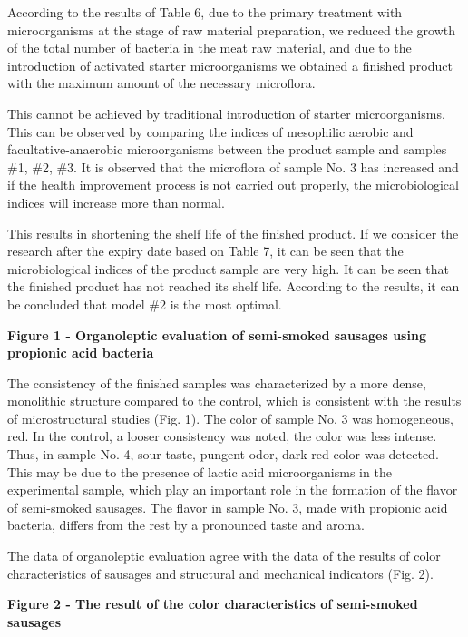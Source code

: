 \begin{multicols}{2}
According to the results of Table 6, due to the primary treatment with
microorganisms at the stage of raw material preparation, we reduced the
growth of the total number of bacteria in the meat raw material, and due
to the introduction of activated starter microorganisms we obtained a
finished product with the maximum amount of the necessary microflora.

This cannot be achieved by traditional introduction of starter
microorganisms. This can be observed by comparing the indices of
mesophilic aerobic and facultative-anaerobic microorganisms between the
product sample and samples \#1, \#2, \#3. It is observed that the
microflora of sample No. 3 has increased and if the health improvement
process is not carried out properly, the microbiological indices will
increase more than normal.

This results in shortening the shelf life of the finished product. If we
consider the research after the expiry date based on Table 7, it can be
seen that the microbiological indices of the product sample are very
high. It can be seen that the finished product has not reached its shelf
life. According to the results, it can be concluded that model \#2 is
the most optimal.
\end{multicols}

{\bfseries Figure 1 - Organoleptic evaluation of semi-smoked sausages using propionic acid bacteria}

\begin{multicols}{2}
The consistency of the finished samples was characterized by a more
dense, monolithic structure compared to the control, which is consistent
with the results of microstructural studies (Fig. 1). The color of
sample No. 3 was homogeneous, red. In the control, a looser consistency
was noted, the color was less intense. Thus, in sample No. 4, sour
taste, pungent odor, dark red color was detected. This may be due to the
presence of lactic acid microorganisms in the experimental sample, which
play an important role in the formation of the flavor of semi-smoked
sausages. The flavor in sample No. 3, made with propionic acid bacteria,
differs from the rest by a pronounced taste and aroma.

The data of organoleptic evaluation agree with the data of the results
of color characteristics of sausages and structural and mechanical
indicators (Fig. 2).
\end{multicols}

{\bfseries Figure 2 - The result of the color characteristics of semi-smoked sausages}

